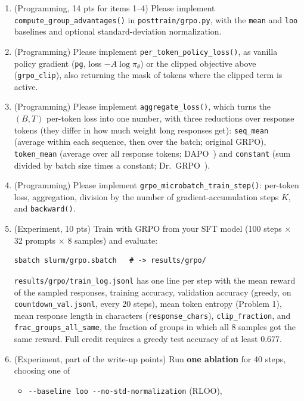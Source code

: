 \documentclass[11pt]{article}
\newcommand{\thrgrpo}{0.677}
\newcommand{\file}[1]{\texttt{#1}}
\begin{document}
\begin{enumerate}
  \item (Programming, 14 pts for items 1--4) Please implement \texttt{compute\_group\_advantages()} in
        \file{posttrain/grpo.py}, with the
        \texttt{mean} and \texttt{loo} baselines and optional standard-deviation normalization.
  \item (Programming) Please implement \texttt{per\_token\_policy\_loss()}, as vanilla policy gradient
        (\texttt{pg}, loss $-A\log\pi_\theta$) or the clipped objective above (\texttt{grpo\_clip}), also returning
        the mask of tokens where the clipped term is active.
  \item (Programming) Please implement \texttt{aggregate\_loss()}, which turns the $(B,T)$ per-token loss into
        one number, with three reductions over response tokens (they differ in how much weight long responses get):
        \texttt{seq\_mean} (average within each sequence, then over the batch; original GRPO),
        \texttt{token\_mean} (average over all response tokens; DAPO~\cite{dapo}) and \texttt{constant} (sum
        divided by batch size times a constant; Dr.~GRPO~\cite{drgrpo}).
  \item (Programming) Please implement \texttt{grpo\_microbatch\_train\_step()}: per-token loss, aggregation,
        division by the number of gradient-accumulation steps $K$, and \texttt{backward()}.
  \item (Experiment, 10 pts) Train with GRPO from your SFT model (100 steps $\times$ 32 prompts $\times$ 8 samples) and
        evaluate:
\begin{lstlisting}
sbatch slurm/grpo.sbatch   # -> results/grpo/\end{lstlisting}
        \file{results/grpo/train\_log.jsonl} has one line per step with the mean reward of the sampled responses,
        training accuracy, validation accuracy (greedy, on \file{countdown\_val.jsonl}, every 20 steps), mean
        token entropy (Problem 1), mean response length in characters (\texttt{response\_chars}),
        \texttt{clip\_fraction}, and
        \texttt{frac\_groups\_all\_same}, the fraction of groups in which all 8 samples got the same reward. Full
        credit requires a greedy test accuracy of at least \thrgrpo.
  \item (Experiment, part of the write-up points) Run \textbf{one ablation} for 40 steps, choosing one of
        \begin{itemize}[nosep]
          \item \texttt{-{}-baseline loo -{}-no-std-normalization} (RLOO),

\end{itemize}
\end{enumerate}
\end{document}
